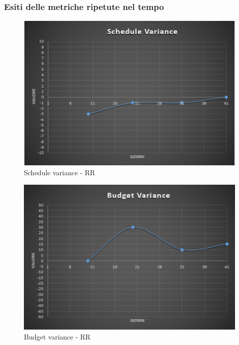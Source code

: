 \newpage

\subsubsection{Esiti delle metriche ripetute nel tempo}

\begin{figure}[H]
	\centering 
	\includegraphics[scale=0.7]{Sezioni/Immagini/ScheduleVariance-RR}
	\caption{Schedule variance - RR}
\end{figure}

\begin{figure}[H]
	\centering 
	\includegraphics[scale=0.7]{Sezioni/Immagini/BudgetVariance-RR}
	\caption{Budget variance - RR}
\end{figure}

